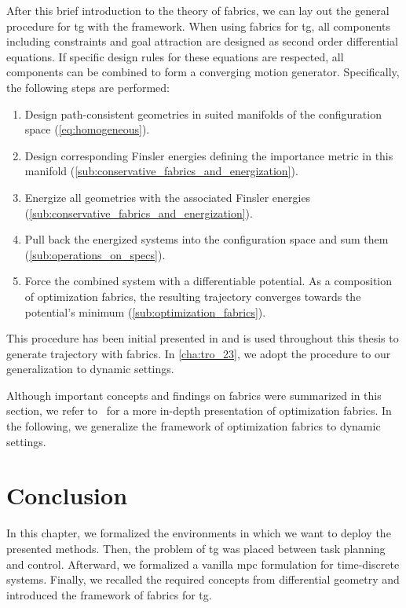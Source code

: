After this brief introduction to the theory of \ac{fabrics},
we can lay out the general procedure for \ac{tg} with the
framework.
When using \ac{fabrics} for \ac{tg}, all
components including constraints and goal attraction are
designed as second order differential equations. If specific
design rules for these equations are respected, all
components can be combined to form a converging motion
generator. Specifically, the following steps are performed:
%
\begin{enumerate}
  \item Design path-consistent geometries in suited manifolds of the configuration space
    (\cref{eq:homogeneous}).
  \item Design corresponding Finsler energies defining the importance metric in this manifold
    (\cref{sub:conservative_fabrics_and_energization}).
  \item Energize all geometries with the associated Finsler energies 
    (\cref{sub:conservative_fabrics_and_energization}).
  \item Pull back the energized systems into the configuration space and sum them 
    (\cref{sub:operations_on_specs}).
  \item Force the combined system with a differentiable potential. As a composition of optimization fabrics, 
    the resulting trajectory converges towards the potential's minimum
    (\cref{sub:optimization_fabrics}).
\end{enumerate}

This procedure has been initial presented in
\cite{Ratliff2020} and is used throughout this thesis to
generate trajectory with \ac{fabrics}. In \cref{cha:tro_23},
we adopt the procedure to our generalization to dynamic
settings.

Although important concepts and findings on \ac{fabrics} were summarized in this
section, we refer to~\cite{Ratliff2020} for a more in-depth presentation of optimization
fabrics. In the following, we generalize the framework of optimization fabrics to dynamic settings.

\section{Conclusion}%
\label{sec:background_conclusion}

In this chapter, we formalized the environments in which we
want to deploy the presented methods. Then, the problem of
\ac{tg} was placed between task planning and control.
Afterward, we formalized a vanilla \ac{mpc} formulation for
time-discrete systems. Finally, we recalled the required
concepts from differential geometry and introduced the
framework of \ac{fabrics} for \ac{tg}.


